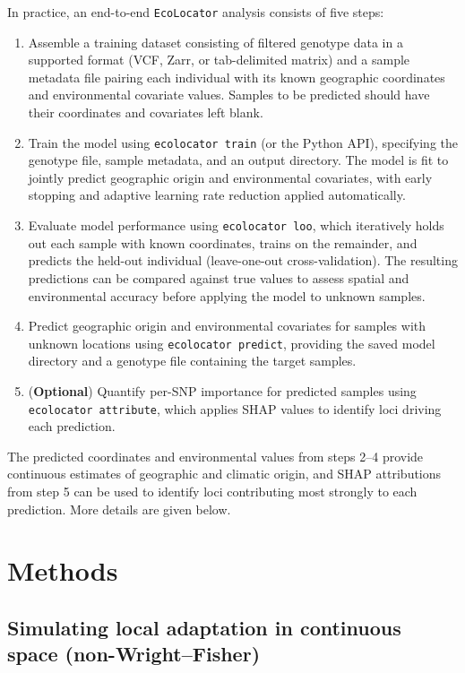 \documentclass[]{article}
\newcommand{\ecolocator}{\texttt{EcoLocator}\xspace}
\begin{document}
In practice, an end-to-end \ecolocator analysis consists of five steps:
\begin{enumerate}
\item Assemble a training dataset consisting of filtered genotype data 
in a supported format (VCF, Zarr, or tab-delimited matrix) 
and a sample metadata file pairing each individual with its 
known geographic coordinates and environmental covariate values. 
Samples to be predicted should have their coordinates and covariates 
left blank.

\item Train the model using \texttt{ecolocator train} (or the Python API), 
specifying the genotype file, sample metadata, and an output directory. 
The model is fit to jointly predict geographic origin and environmental 
covariates, with early stopping and adaptive learning rate reduction applied 
automatically.

\item Evaluate model performance using \texttt{ecolocator loo}, 
which iteratively holds out each sample with known coordinates, trains 
on the remainder, and predicts the held-out individual (leave-one-out cross-validation).
The resulting predictions can be compared against true values to assess spatial and 
environmental accuracy before applying the model to unknown samples.

\item Predict geographic origin and environmental covariates for samples 
with unknown locations using \texttt{ecolocator predict}, providing the 
saved model directory and a genotype file containing the target samples.

\item (\textbf{Optional}) Quantify per-SNP importance for predicted samples 
using \texttt{ecolocator attribute}, which applies SHAP values to 
identify loci driving each prediction.
\end{enumerate}

The predicted coordinates and environmental values from steps 2--4 provide 
continuous estimates of geographic and climatic origin, and SHAP attributions 
from step 5 can be used to identify loci contributing most strongly to each prediction.
More details are given below. 

\section{Methods}

\subsection{Simulating local adaptation in continuous space (non-Wright--Fisher)}
\end{document}
